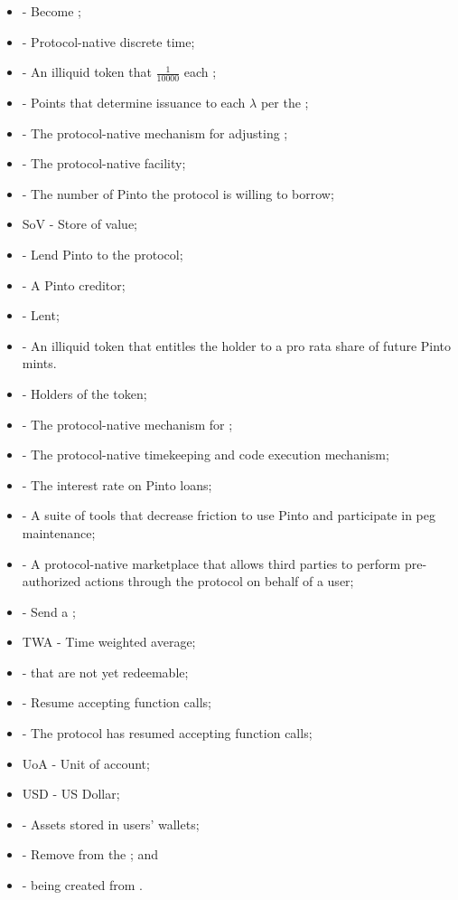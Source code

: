 \documentclass[class=article, crop=false]{standalone}
\begin{document}
\begin{itemize}[topsep=0pt, itemsep=3pt,leftmargin=16pt]
    \item[]  - Become ;
    \item[]  - Protocol-native discrete time;
    \item[]  - An illiquid token that  $\frac{1}{10000}$  each ;
    \item[]  - Points that determine  issuance to each $\lambda$ per the ;
    \item[]  - The protocol-native mechanism for adjusting ;
    \item[]  - The protocol-native  facility;
    \item[]  - The number of Pinto the protocol is willing to borrow;
    \item[] SoV - Store of value;
    \item[]  - Lend Pinto to the protocol;
    \item[]  - A Pinto creditor;
    \item[]  - Lent;
    \item[]  - An illiquid token that entitles the holder to a pro rata share of future Pinto mints.
    \item[]  - Holders of the  token;
    \item[]  - The protocol-native mechanism for ;
    \item[]  - The protocol-native timekeeping and code execution mechanism;
    \item[]  - The interest rate on Pinto loans;
    \item[]  - A suite of tools that decrease friction to use Pinto and participate in peg maintenance;
    \item[]  - A protocol-native marketplace that allows third parties to perform pre-authorized actions through the protocol on behalf of a user;
    \item[]  - Send a ;
    \item[] TWA - Time weighted average;
    \item[]  -  that are not yet redeemable;
    \item[]  - Resume accepting  function calls;
    \item[]  - The protocol has resumed accepting  function calls;
    \item[] UoA - Unit of account;
    \item[] USD - US Dollar;
    \item[]  - Assets stored in users' wallets;
    \item[]  - Remove from the ; and
    \item[]  -  being created from  \Pinto.
\end{itemize}
\end{document}
